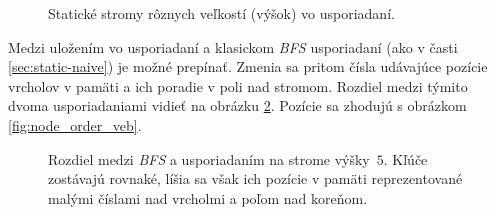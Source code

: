 \begin{figure}
    \hspace{0.5cm}
    \caption[Statické stromy rôznych veľkostí]{Statické stromy rôznych veľkostí (výšok) vo \vEB usporiadaní.}
    \label{fig:ss_static_sizes}
\end{figure}

Medzi uložením vo \vEB usporiadaní a klasickom \emph{BFS} usporiadaní (ako v časti \ref{sec:static-naive}) je možné prepínať. Zmenia sa pritom čísla udávajúce pozície vrcholov v pamäti a ich poradie v poli nad stromom. Rozdiel medzi týmito dvoma usporiadaniami vidieť na obrázku \ref{fig:ss_static_order}. Pozície sa zhodujú s obrázkom \ref{fig:node_order_veb}.

\begin{figure}
    \centering
    \caption[Rozdiel medzi \emph{BFS} a \vEB usporiadaním]{Rozdiel medzi \emph{BFS} a \vEB usporiadaním na strome výšky~$5$. Kľúče zostávajú rovnaké, líšia sa však ich pozície v pamäti reprezentované malými číslami nad vrcholmi a poľom nad koreňom.}
    \label{fig:ss_static_order}
\end{figure}

